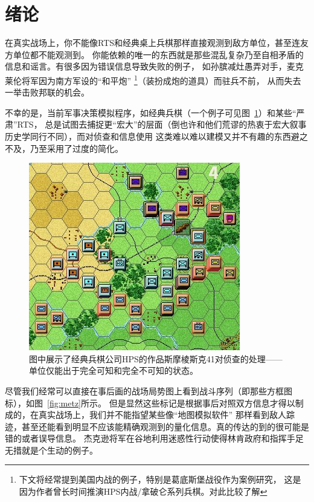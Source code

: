 \documentclass{sicnuthesis}
\begin{document}
\newpage

\tableofcontents

\newpage

\mainmatter %

\section{绪论}

在真实战场上，你不能像RTS和经典桌上兵棋那样直接观测到敌方单位，甚至连友方单位都不能观测到。
你能依赖的唯一的东西就是那些混乱复杂乃至自相矛盾的信息和谣言。有很多因为错误信息导致失败的例子，
如孙膑减灶愚弄对手，麦克莱伦将军因为南方军设的“和平炮”
\footnote{下文将经常提到美国内战的例子，特别是葛底斯堡战役作为案例研究，
这是因为作者曾长时间推演HPS内战/拿破仑系列兵棋。对此比较了解}（装扮成炮的道具）而驻兵不前，
从而失去一举击败邦联的机会。

不幸的是，当前军事决策模拟程序，如经典兵棋（一个例子可见图~\ref{fig:hps}）和某些“严肃”RTS，
总是试图去捕捉更“宏大”的层面（倒也许和他们荒谬的热衷于宏大叙事历史学同行不同），而对侦查和信息使用
这类难以难以建模又并不有趣的东西避之不及，乃至采用了过度的简化。

\begin{figure}[htb]
\includegraphics[width=0.6\linewidth]{SmolenskR4.jpg}
\caption{
图中展示了经典兵棋公司HPS的作品斯摩棱斯克41对侦查的处理——单位仅能出于完全可知和完全不可知的状态。 }
\label{fig:hps}
\end{figure}


尽管我们经常可以直接在事后画的战场局势图上看到战斗序列（即那些方框图标），如图~\ref{fig:metz}所示。
但是显然这些标记是根据事后对照双方信息才得以制成的，在真实战场上，我们并不能指望某些像“地图模拟软件”
那样看到敌人踪迹，甚至还能看到明显不应该能精确观测到的量化信息。真的传达的到的很可能是错的或者误导信息。
杰克逊将军在谷地利用迷惑性行动使得林肯政府和指挥手足无措就是个生动的例子。
\end{document}

